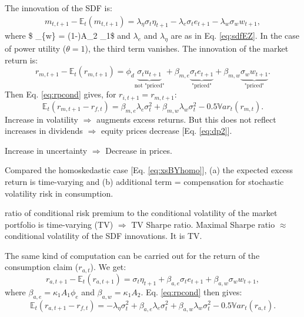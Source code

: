 \documentclass[
  12pt,
]{book}
\theoremstyle{definition}
\theoremstyle{definition}
\theoremstyle{definition}
\theoremstyle{definition}
\theoremstyle{remark}
\begin{document}
The innovation of the SDF is:
\begin{eqnarray}
m_{t,t+1} - \mathbb{E}_t(m_{t,t+1}) = \lambda_{\eta} \sigma_t \eta_{t+1} - \lambda_{e} \sigma_t e_{t+1} - \lambda_{w} \sigma_w w_{t+1},\label{eq:mBY2}
\end{eqnarray}
where \$ \lambda\_\{w\} = (1-\theta)A\_2 \kappa\_1\$ and \(\lambda_e\) and \(\lambda_\eta\) are as in Eq. \eqref{eq:sdfEZ}.
In the case of power utility (\(\theta = 1\)), the third term vanishes.
The innovation of the market return is:
\begin{equation}
r_{m,t+1} - \mathbb{E}_t(r_{m,t+1}) = \phi_d  \underbrace{\sigma_t u_{t+1}}_{\mbox{not "priced"}} + \beta_{m,e}  \underbrace{ \sigma_t e_{t+1}}_{\mbox{"priced"}} + \beta_{m,w}  \underbrace{ \sigma_w w_{t+1}}_{\mbox{"priced"}}.\label{eq:rmErmHetero}
\end{equation}
Then Eq. \eqref{eq:rpcond} gives, for \(r_{i,t+1}=r_{m,t+1}\):
\begin{equation}
\mathbb{E}_t(r_{m,t+1} - r_{f,t}) = \beta_{m,e}\lambda_{e} \sigma_t^2 + \beta_{m,w}\lambda_{w} \sigma_t^2 - 0.5 \mathbb{V}ar_t(r_{m,t}).\label{eq:xsBYhetero}
\end{equation}
Increase in volatility \(\Rightarrow\) augments excess returns. But this does not reflect increases in dividends \(\Rightarrow\) equity prices decrease {[}Eq. \eqref{eq:dp2}{]}.

Increase in uncertainty \(\Rightarrow\) Decrease in prices.

Compared the homoskedastic case {[}Eq. \eqref{eq:xsBYhomo}{]}, (a) the expected excess return is time-varying and (b) additional term = compensation for stochastic volatility risk in consumption.

ratio of conditional risk premium to the conditional volatility of the market portfolio is time-varying (TV) \(\Rightarrow\) TV Sharpe ratio.
Maximal Sharpe ratio \(\approx\) conditional volatility of the SDF innovations. It is TV.

The same kind of computation can be carried out for the return of the consumption claim (\(r_{a,t}\)). We get:
\begin{equation}
r_{a,t+1} - \mathbb{E}_t(r_{a,t+1}) = \sigma_t \eta_{t+1} + \beta_{a,e}  \sigma_t e_{t+1} + \beta_{a,w}  \sigma_w w_{t+1},\label{eq:raEraHetero}
\end{equation}
where \(\beta_{a,e}=\kappa_1 A_1 \phi_e\) and \(\beta_{a,w}=\kappa_1A_2\).
Eq. \eqref{eq:rpcond} then gives:
\begin{equation}
\mathbb{E}_t(r_{a,t+1} - r_{f,t}) = -\lambda_{\eta} \sigma_t^2 + \beta_{a,e}\lambda_{e} \sigma_t^2 + \beta_{a,w}\lambda_{w} \sigma_t^2 - 0.5 \mathbb{V}ar_t(r_{a,t}).\label{eq:xsaBYhetero}
\end{equation}
\end{document}
